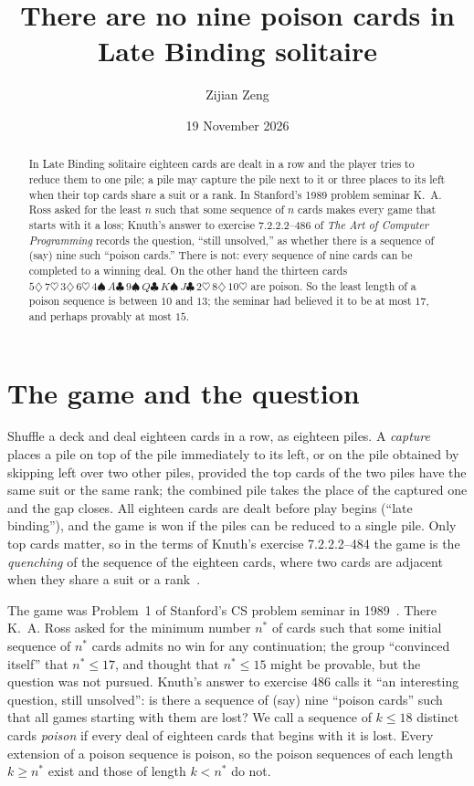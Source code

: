 \documentclass[11pt]{amsart}
\theoremstyle{remark}
\newcommand{\Sp}{\spadesuit}\newcommand{\He}{\heartsuit}\newcommand{\Di}{\diamondsuit}\newcommand{\Cl}{\clubsuit}
\begin{document}
\title[Poison cards in Late Binding solitaire]{There are no nine poison cards in Late Binding solitaire}
\author{Zijian Zeng}
\address{UCSI University, Kuala Lumpur, Malaysia}
\date{19 November 2026}
\begin{abstract}
In Late Binding solitaire eighteen cards are dealt in a row and the player tries to reduce them to one pile; a pile may
capture the pile next to it or three places to its left when their top cards share a suit or a rank. In Stanford's
1989 problem seminar K.~A. Ross asked for the least $n$ such that some sequence of $n$ cards makes every game that
starts with it a loss; Knuth's answer to exercise 7.2.2.2--486 of \emph{The Art of Computer Programming} records the
question, ``still unsolved,'' as whether there is a sequence of (say) nine such ``poison cards.'' There is not: every
sequence of nine cards can be completed to a winning deal. On the other hand the thirteen cards
$5\Di\,7\He\,3\Di\,6\He\,4\Sp\,A\Cl\,9\Sp\,Q\Cl\,K\Sp\,J\Cl\,2\He\,8\Di\,10\He$ are poison. So the least length
of a poison sequence is between $10$ and $13$; the seminar had believed it to be at most $17$, and perhaps provably
at most $15$.
\end{abstract}
\maketitle

\section{The game and the question}
Shuffle a deck and deal eighteen cards in a row, as eighteen piles. A \emph{capture} places a pile on top of the pile
immediately to its left, or on the pile obtained by skipping left over two other piles, provided the top cards of the
two piles have the same suit or the same rank; the combined pile takes the place of the captured one and the gap
closes. All eighteen cards are dealt before play begins (``late binding''), and the game is won if the piles can be
reduced to a single pile. Only top cards matter, so in the terms of Knuth's exercise 7.2.2.2--484 the game is the
\emph{quenching} of the sequence of the eighteen cards, where two cards are adjacent when they share a suit or a
rank~\cite[\S7.2.2.2, exercises 484--486]{knuth4b}.

The game was Problem~1 of Stanford's CS problem seminar in 1989~\cite{rossknuth}. There K.~A. Ross asked for the
minimum number $n^*$ of cards such that some initial sequence of $n^*$ cards admits no win for any continuation; the
group ``convinced itself'' that $n^*\le17$, and thought that $n^*\le15$ might be provable, but the question was not
pursued. Knuth's answer to exercise 486 calls it ``an interesting question, still unsolved'': is there a sequence of
(say) nine ``poison cards'' such that all games starting with them are lost? We call a sequence of $k\le18$ distinct
cards \emph{poison} if every deal of eighteen cards that begins with it is lost. Every extension of a poison sequence
is poison, so the poison sequences of each length $k\ge n^*$ exist and those of length $k<n^*$ do not.
\end{document}
